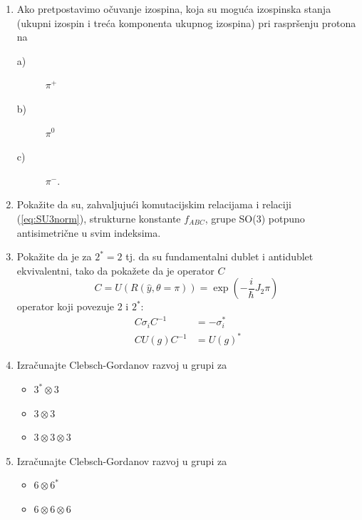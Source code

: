 \begin{enumerate}[label=\arabic{chapter}.\arabic*.]

\item Ako pretpostavimo očuvanje izospina, koja su moguća izospinska
stanja (ukupni izospin i treća komponenta ukupnog izospina) pri
raspršenju protona na

 \begin{description} \item[a)] $\pi^+$
                     \item[b)] $\pi^0$
                     \item[c)] $\pi^-$. \end{description}


\item \label{zad:fabc}
Pokažite da su, zahvaljujući komutacijskim relacijama i relaciji (\ref{eq:SU3norm}),
strukturne konstante $f_{ABC}$, grupe SO(3) potpuno antisimetrične u
svim indeksima.

\item \label{zad:su2dublet}
Pokažite da je za   $2^* = 2$ tj. da su fundamentalni dublet i
antidublet ekvivalentni, tako da pokažete da je operator $C$
\begin{displaymath}
  C = U(R(\hat{y},\theta=\pi)) = \exp\left(-\frac{i}{\hbar} J_2 \pi\right) \;
\end{displaymath}
operator koji povezuje 2 i $2^*$:
\begin{align*}
C \sigma_i C^{-1}& = - \sigma_{i}^* \\
C U(g) C^{-1}& = U(g)^*
\end{align*}


\item \label{zad:3x3x3}
Izračunajte Clebsch-Gordanov razvoj u  grupi za
\begin{itemize}
\item $3^* \otimes 3$
\item $3 \otimes 3$
\item $3 \otimes 3 \otimes 3$
\end{itemize}

\item Izračunajte Clebsch-Gordanov razvoj u  grupi za
\begin{itemize}
\item $6 \otimes 6^*$
\item $6 \otimes 6 \otimes 6$
\end{itemize}

\end{enumerate}
